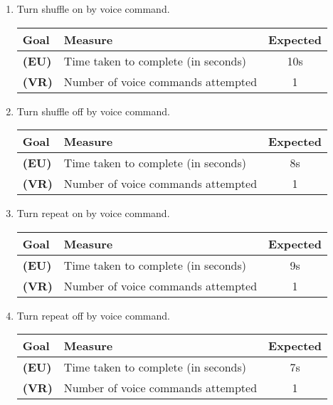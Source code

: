 \documentclass[12pt,letterpaper]{article}
\begin{document}
\begin{enumerate}
\item Turn shuffle on by voice command.
\begin{center}\begin{tabular}{l|l|c}
\textbf{Goal} & \textbf{Measure} & \textbf{Expected} \\
\hline
\textbf{(EU)} & Time taken to complete (in seconds) & 10s \\
\hline
\textbf{(VR)} & Number of voice commands attempted & 1 \\
\hline
\end{tabular}\end{center}

\item Turn shuffle off by voice command.
\begin{center}\begin{tabular}{l|l|c}
\textbf{Goal} & \textbf{Measure} & \textbf{Expected} \\
\hline
\textbf{(EU)} & Time taken to complete (in seconds) & 8s \\
\hline
\textbf{(VR)} & Number of voice commands attempted & 1 \\
\hline
\end{tabular}\end{center}

\item Turn repeat on by voice command.
\begin{center}\begin{tabular}{l|l|c}
\textbf{Goal} & \textbf{Measure} & \textbf{Expected} \\
\hline
\textbf{(EU)} & Time taken to complete (in seconds) & 9s \\
\hline
\textbf{(VR)} & Number of voice commands attempted & 1 \\
\hline
\end{tabular}\end{center}

\item Turn repeat off by voice command.
\begin{center}\begin{tabular}{l|l|c}
\textbf{Goal} & \textbf{Measure} & \textbf{Expected} \\
\hline
\textbf{(EU)} & Time taken to complete (in seconds) & 7s \\
\hline
\textbf{(VR)} & Number of voice commands attempted & 1 \\
\hline
\end{tabular}\end{center}


\end{enumerate}
\end{document}

